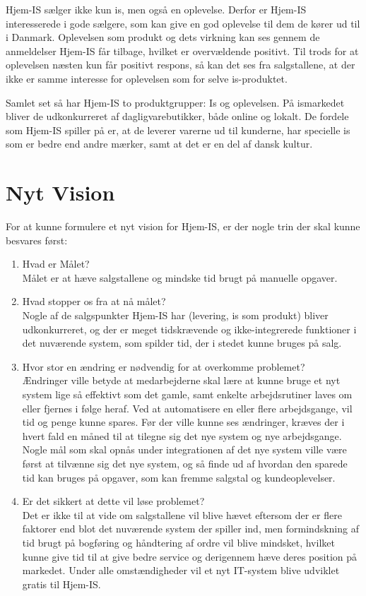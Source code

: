 Hjem-IS sælger ikke kun is, men også en oplevelse. Derfor er Hjem-IS interesserede i gode sælgere, som kan give en god oplevelse til dem de kører ud til i Danmark. Oplevelsen som produkt og dets virkning kan ses gennem de anmeldelser Hjem-IS får tilbage, hvilket er overvældende positivt. Til trods for at oplevelsen næsten kun får positivt respons, så kan det ses fra salgstallene, at der ikke er samme interesse for oplevelsen som for selve is-produktet. 

Samlet set så har Hjem-IS to produktgrupper: Is og oplevelsen. På ismarkedet bliver de udkonkurreret af dagligvarebutikker, både online og lokalt. De fordele som Hjem-IS spiller på er, at de leverer varerne ud til kunderne, har specielle is som er bedre end andre mærker, samt at det er en del af dansk kultur.

\section{Nyt Vision}
For at kunne formulere et nyt vision for Hjem-IS, er der nogle trin \cite{How2bsns} der skal kunne besvares først:
\begin{enumerate}
    \item Hvad er Målet? \\
    Målet er at hæve salgstallene og mindske tid brugt på manuelle opgaver.
    \item Hvad stopper os fra at nå målet? \\
    Nogle af de salgspunkter Hjem-IS har (levering, is som produkt) bliver udkonkurreret, og der er meget tidskrævende og ikke-integrerede funktioner i det nuværende system, som spilder tid, der i stedet kunne bruges på salg.
    \item Hvor stor en ændring er nødvendig for at overkomme problemet? \\
    Ændringer ville betyde at medarbejderne skal lære at kunne bruge et nyt system lige så effektivt som det gamle, samt enkelte arbejdsrutiner laves om eller fjernes i følge heraf. Ved at automatisere en eller flere arbejdsgange, vil tid og penge kunne spares. Før der ville kunne ses ændringer, kræves der i hvert fald en måned til at tilegne sig det nye system og nye arbejdsgange. Nogle mål som skal opnås under integrationen af det nye system ville være først at tilvænne sig det nye system, og så finde ud af hvordan den sparede tid kan bruges på opgaver, som kan fremme salgstal og kundeoplevelser.
    \item Er det sikkert at dette vil løse problemet? \\
    Det er ikke til at vide om salgstallene vil blive hævet eftersom der er flere faktorer end blot det nuværende system der spiller ind, men formindskning af tid brugt på bogføring og håndtering af ordre vil blive mindsket, hvilket kunne give tid til at give bedre service og derigennem hæve deres position på markedet. Under alle omstændigheder vil et nyt IT-system blive udviklet gratis til Hjem-IS.    
\end{enumerate}

